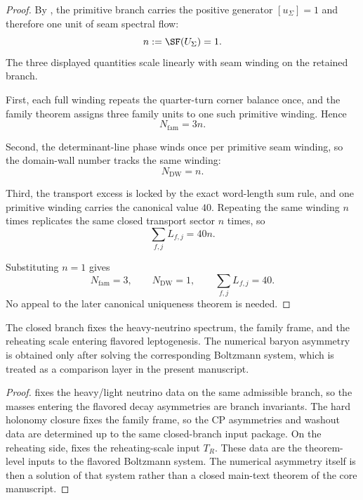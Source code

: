 \begin{proof}
By , the primitive branch carries the positive generator
$[u_\Sigma]=1$ and therefore one unit of seam spectral flow:
\[
n:=\SF(U_\Sigma)=1.
\]
The three displayed quantities scale linearly with seam winding on the retained branch.

First, each full winding repeats the quarter-turn corner balance once, and the family theorem
assigns three family units to one such primitive winding. Hence
\[
N_{\mathrm{fam}}=3n.
\]

Second, the determinant-line phase winds once per primitive seam winding, so the domain-wall number
tracks the same winding:
\[
N_{\mathrm{DW}}=n.
\]

Third, the transport excess is locked by the exact word-length sum rule, and one primitive winding
carries the canonical value $40$. Repeating the same winding $n$ times replicates the same closed
transport sector $n$ times, so
\[
\sum_{f,j}L_{f,j}=40n.
\]

Substituting $n=1$ gives
\[
N_{\mathrm{fam}}=3,
\qquad
N_{\mathrm{DW}}=1,
\qquad
\sum_{f,j}L_{f,j}=40.
\]
No appeal to the later canonical uniqueness theorem is needed.
\end{proof}

\begin{theorem}
\label{thm:leptogenesis-closure}
The closed branch fixes the heavy-neutrino spectrum, the family frame, and the reheating scale
entering flavored leptogenesis. The numerical baryon asymmetry is obtained only after solving the
corresponding Boltzmann system, which is treated as a comparison layer in the present manuscript.
\end{theorem}

\begin{proof}
 fixes the heavy/light neutrino data on the same admissible branch, so
the masses entering the flavored decay asymmetries are branch invariants. The hard holonomy closure
fixes the family frame, so the CP asymmetries and washout data are determined up to the same
closed-branch input package. On the reheating side,  fixes the
reheating-scale input $T_R$. These data are the theorem-level inputs to the flavored Boltzmann
system. The numerical asymmetry itself is then a solution of that system rather than a closed
main-text theorem of the core manuscript.
\end{proof}


